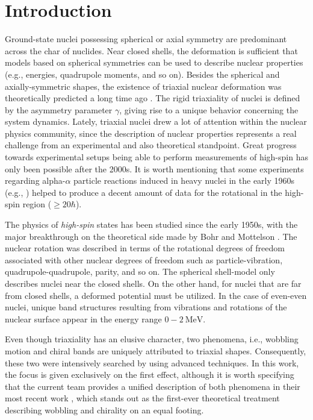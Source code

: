 \chapter{Introduction}

Ground-state nuclei possessing spherical or axial symmetry are predominant across the char of nuclides. Near closed shells, the deformation is sufficient that models based on spherical symmetries can be used to describe nuclear properties (e.g., energies, quadrupole moments, and so on). Besides the spherical and axially-symmetric shapes, the existence of triaxial nuclear deformation was theoretically predicted a long time ago \cite{bohr1998nuclear}. The rigid triaxiality of nuclei is defined by the asymmetry parameter $\gamma$, giving rise to a unique behavior concerning the system dynamics. Lately, triaxial nuclei drew a lot of attention within the nuclear physics community, since the description of nuclear properties represents a real challenge from an experimental and also theoretical standpoint. Great progress towards experimental setups being able to perform measurements of high-spin has only been possible after the 2000s. It is worth mentioning that some experiments regarding alpha-$\alpha$ particle reactions induced in heavy nuclei in the early 1960s (e.g., \cite{morinaga1963gamma}) helped to produce a decent amount of data for the rotational in the high-spin region ($\geq 20 \hbar$).

The physics of \emph{high-spin} states has been studied since the early 1950s, with the major breakthrough on the theoretical side made by Bohr and Mottelson \cite{bohr1998nuclear}. The nuclear rotation was described in terms of the rotational degrees of freedom associated with other nuclear degrees of freedom such as particle-vibration, quadrupole-quadrupole, parity, and so on. The spherical shell-model only describes nuclei near the closed shells. On the other hand, for nuclei that are far from closed shells, a deformed potential must be utilized. In the case of even-even nuclei, unique band structures resulting from vibrations and rotations of the nuclear surface appear in the energy range $0-2\ \text{MeV}$.

Even though triaxiality has an elusive character, two phenomena, i.e., wobbling motion and chiral bands are uniquely attributed to triaxial shapes. Consequently, these two were intensively searched by using advanced techniques. In this work, the focus is given exclusively on the first effect, although it is worth specifying that the current team provides a unified description of both phenomena in their most recent work \cite{raduta2022simultaneous}, which stands out as the first-ever theoretical treatment describing wobbling and chirality on an equal footing.

